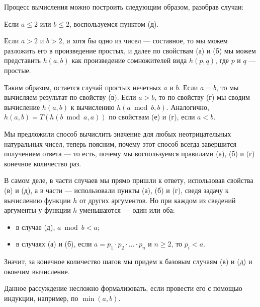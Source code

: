 \begin{enumerate}
Процесс вычисления можно построить следующим образом, разобрав случаи: 

Если $a \le 2$ или $b \le 2$, воспользуемся пунктом (д).

Если $a > 2$ и $b > 2$, и хотя бы одно из чисел --- составное, то мы можем разложить
его в произведение простых, и далее по свойствам (а) и (б) 
мы можем представить $h(a,b)$ как произведение сомножителей вида $h(p,q)$, 
где $p$ и $q$ --- простые.

Таким образом, остается случай простых нечетных $a$ и $b$. Если
$a = b$, то мы вычисляем результат по свойству (в). Если $a > b$, то
по свойству (г) мы сводим вычисление $h(a,b)$ к вычислению $h(a \bmod b,b)$. 
Аналогично, $h(a,b) = T(h(b \bmod a,a))$ по свойствам (е) и (г), если $a < b$.

Мы предложили способ вычислить значение для любых неотрицательных натуральных
чисел, теперь поясним, почему этот способ всегда завершится получением
ответа --- то есть, почему мы воспользуемся правилами (а), (б) и (г) конечное количество раз.

В самом деле, в части случаев мы прямо пришли к ответу, использовав свойства (в) и (д), а в части ---
использовали пункты (а), (б) и (г), сведя задачу к вычислению функции $h$
от других аргументов. Но при каждом из сведений аргументы у функции $h$ уменьшаются ---
один или оба: \begin{itemize}
\item в случае (д), $a \bmod b < a$; 
\item в случаях (а) и (б), если $a = p_1 \cdot p_2 \cdot \ldots \cdot p_n$ и $n \ge 2$, то $p_i < a$.
\end{itemize}

Значит, за конечное количество шагов мы придем к базовым случаям (в) и (д) и окончим вычисление.

Данное рассуждение несложно формализовать, если провести его с помощью индукции, например, 
по $\min(a,b)$.
\end{enumerate}
